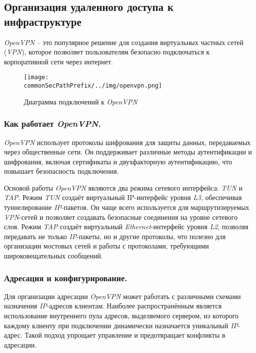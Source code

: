 \subsection{Организация удаленного доступа к инфраструктуре}
\label{sec:vpn}
\textit{OpenVPN} -- это популярное решение для создания виртуальных частных сетей (\textit{VPN})\cite{openvpn}, которое позволяет пользователям безопасно подключаться к корпоративной сети через интернет.

\begin{figure}[ht]
    \centering
    \texttt{[image: \\commonSecPathPrefix/../img/openvpn.png]}
    \caption{Диаграмма подключений к \textit{OpenVPN}}
    \label{fig:user_guide:openvpn_diagram}
\end{figure}

\subsubsection{Как работает \textit{OpenVPN}.}
\textit{OpenVPN} использует протоколы шифрования для защиты данных, передаваемых через общественные сети. Он поддерживает различные методы аутентификации и шифрования, включая сертификаты и двухфакторную аутентификацию, что повышает безопасность подключения.

Основой работы \textit{OpenVPN} являются два режима сетевого интерфейса: \textit{TUN} и \textit{TAP}. Режим \textit{TUN} создаёт виртуальный IP-интерфейс уровня \textit{L3}, обеспечивая туннелирование \textit{IP}-пакетов. Он чаще всего используется для маршрутизируемых \textit{VPN}-сетей и позволяет создавать безопасные соединения на уровне сетевого слоя. Режим \textit{TAP} создаёт виртуальный \textit{Ethernet}-интерфейс уровня \textit{L2}, позволяя передавать не только \textit{IP}-пакеты, но и другие протоколы, что полезно для организации мостовых сетей и работы с протоколами, требующими широковещательных сообщений.

\subsubsection{Адресация и конфигурирование.}
Для организации адресации \textit{OpenVPN} может работать с различными схемами назначения \textit{IP}-адресов клиентам. Наиболее распространённым является использование внутреннего пула адресов, выделяемого сервером, из которого каждому клиенту при подключении динамически назначается уникальный \textit{IP}-адрес. Такой подход упрощает управление и предотвращает конфликты в адресации.

